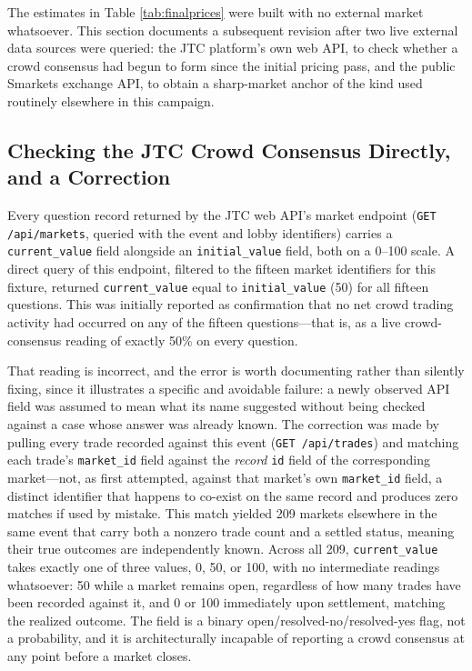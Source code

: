 \documentclass[11pt]{article}
\begin{document}
The estimates in Table \ref{tab:finalprices} were built with no external market
whatsoever. This section documents a subsequent revision after two live external data
sources were queried: the JTC platform's own web API, to check whether a crowd consensus
had begun to form since the initial pricing pass, and the public Smarkets exchange API,
to obtain a sharp-market anchor of the kind used routinely elsewhere in this campaign.

\subsection{Checking the JTC Crowd Consensus Directly, and a Correction}

Every question record returned by the JTC web API's market endpoint
(\texttt{GET /api/markets}, queried with the event and lobby identifiers) carries a
\texttt{current\_value} field alongside an \texttt{initial\_value} field, both on a
0--100 scale. A direct query of this endpoint, filtered to the fifteen market
identifiers for this fixture, returned \texttt{current\_value} equal to
\texttt{initial\_value} (50) for all fifteen questions. This was initially reported as
confirmation that no net crowd trading activity had occurred on any of the fifteen
questions---that is, as a live crowd-consensus reading of exactly 50\% on every
question.

That reading is incorrect, and the error is worth documenting rather than silently
fixing, since it illustrates a specific and avoidable failure: a newly observed API
field was assumed to mean what its name suggested without being checked against a case
whose answer was already known. The correction was made by pulling every trade recorded
against this event (\texttt{GET /api/trades}) and matching each trade's \texttt{market\_id}
field against the \emph{record} \texttt{id} field of the corresponding market---not, as
first attempted, against that market's own \texttt{market\_id} field, a distinct
identifier that happens to co-exist on the same record and produces zero matches if used
by mistake. This match yielded 209 markets elsewhere in the same event that carry both a
nonzero trade count and a settled status, meaning their true outcomes are independently
known. Across all 209, \texttt{current\_value} takes exactly one of three values, 0, 50,
or 100, with no intermediate readings whatsoever: 50 while a market remains open,
regardless of how many trades have been recorded against it, and 0 or 100 immediately
upon settlement, matching the realized outcome. The field is a binary
open/resolved-no/resolved-yes flag, not a probability, and it is architecturally
incapable of reporting a crowd consensus at any point before a market closes.
\end{document}
